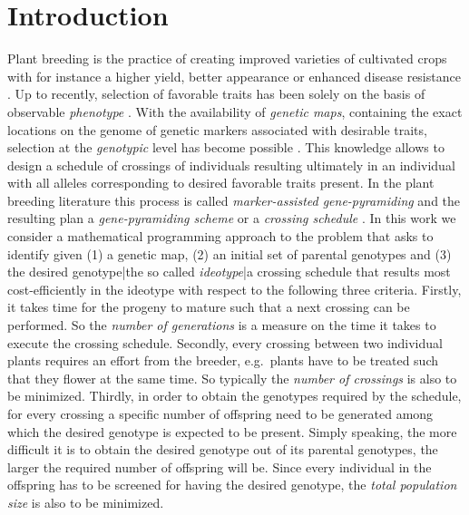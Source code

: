 \documentclass[runningheads]{llncs}
\begin{document}
\section{Introduction}
Plant breeding is the practice of creating improved varieties of cultivated crops with for instance a higher yield, better appearance or enhanced disease resistance \cite{BC:2008}. Up to recently, selection of favorable traits has been solely on the basis of observable \emph{phenotype} \cite{Dekkers:2002}. With the availability of \emph{genetic maps}, containing the exact locations on the genome of genetic markers associated with desirable traits, selection at the \emph{genotypic} level has become possible \cite{Moose:2008}. This knowledge allows to design a schedule of crossings of individuals resulting ultimately in an individual with all alleles corresponding to desired favorable traits present. In the plant breeding literature this process is called \emph{marker-assisted gene-pyramiding} and the resulting plan a \emph{gene-pyramiding scheme} or a \emph{crossing schedule} \cite{Servin:2004,Collard:2008,Ye:2008}. In this work we consider a mathematical programming approach to the problem that asks to identify given (1) a genetic map, (2) an initial set of parental genotypes and (3) the desired genotype|the so called \emph{ideotype}|a crossing schedule that results most cost-efficiently in the ideotype with respect to the following three criteria. Firstly, it takes time for the progeny to mature such that a next crossing can be performed. So the \emph{number of generations} is a measure on the time it takes to execute the crossing schedule. Secondly, every crossing between two individual plants requires an effort from the breeder, e.g.\ plants have to be treated such that they flower at the same time. So typically the \emph{number of crossings} is also to be minimized. Thirdly, in order to obtain the genotypes required by the schedule, for every crossing a specific number of offspring need to be generated among which the desired genotype is expected to be present. Simply speaking, the more difficult it is to obtain the desired genotype out of its parental genotypes, the larger the required number of offspring will be. Since every individual in the offspring has to be screened for having the desired genotype, the \emph{total population size} is also to be minimized.
\end{document}
